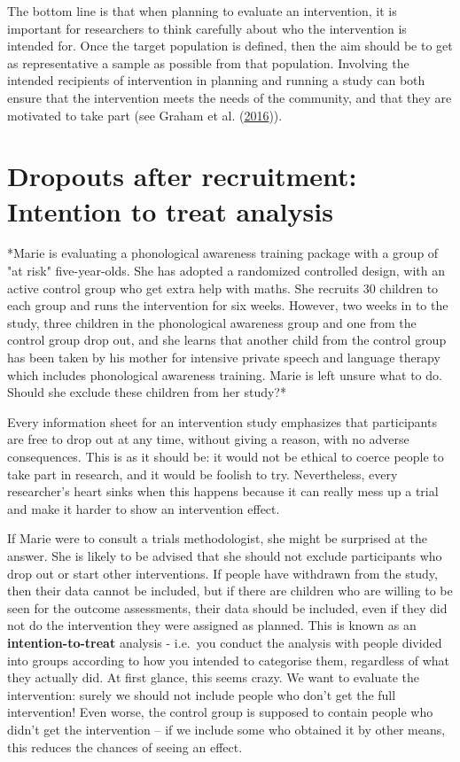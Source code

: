 \documentclass{krantz}
\begin{document}
The bottom line is that when planning to evaluate an intervention, it is important for researchers to think carefully about who the intervention is intended for. Once the target population is defined, then the aim should be to get as representative a sample as possible from that population. Involving the intended recipients of intervention in planning and running a study can both ensure that the intervention meets the needs of the community, and that they are motivated to take part (see Graham et al. (\protect\hyperlink{ref-graham2016}{2016})).

\hypertarget{dropouts-after-recruitment-intention-to-treat-analysis}{%
\section{Dropouts after recruitment: Intention to treat analysis}\label{dropouts-after-recruitment-intention-to-treat-analysis}}

\begin{shaded}
*Marie is evaluating a phonological awareness training package with a group of "at risk" five-year-olds. She has adopted a randomized controlled design, with an active control group who get extra help with maths. She recruits 30 children to each group and runs the intervention for six weeks. However, two weeks in to the study, three children in the phonological awareness group and one from the control group drop out, and she learns that another child from the control group has been taken by his mother for intensive private speech and language therapy which includes phonological awareness training. Marie is left unsure what to do. Should she exclude these children from her study?*
\end{shaded}

Every information sheet for an intervention study emphasizes that participants are free to drop out at any time, without giving a reason, with no adverse consequences. This is as it should be: it would not be ethical to coerce people to take part in research, and it would be foolish to try. Nevertheless, every researcher's heart sinks when this happens because it can really mess up a trial and make it harder to show an intervention effect.

If Marie were to consult a trials methodologist, she might be surprised at the answer. She is likely to be advised that she should not exclude participants who drop out or start other interventions. If people have withdrawn from the study, then their data cannot be included, but if there are children who are willing to be seen for the outcome assessments, their data should be included, even if they did not do the intervention they were assigned as planned. This is known as an \textbf{intention-to-treat} analysis - i.e.~you conduct the analysis with people divided into groups according to how you intended to categorise them, regardless of what they actually did. At first glance, this seems crazy. We want to evaluate the intervention: surely we should not include people who don't get the full intervention! Even worse, the control group is supposed to contain people who didn't get the intervention -- if we include some who obtained it by other means, this reduces the chances of seeing an effect.
\end{document}
